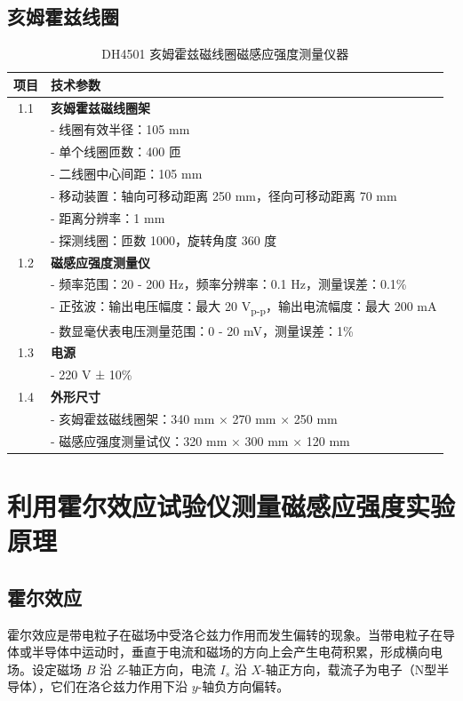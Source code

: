 \documentclass[a4paper,10pt]{article}
\begin{document}
\subsection{亥姆霍兹线圈}

\begin{table}[H]
\centering
\caption{DH4501 亥姆霍兹磁线圈磁感应强度测量仪器}
\begin{tabular}{|c|l|}
\hline
\textbf{项目} & \textbf{技术参数} \\ \hline
1.1 & \textbf{亥姆霍兹磁线圈架} \\ \hline
& \quad - 线圈有效半径：105 mm \\ \hline
& \quad - 单个线圈匝数：400 匝 \\ \hline
& \quad - 二线圈中心间距：105 mm \\ \hline
& \quad - 移动装置：轴向可移动距离 250 mm，径向可移动距离 70 mm \\ \hline
& \quad - 距离分辨率：1 mm \\ \hline
& \quad - 探测线圈：匝数 1000，旋转角度 360 度 \\ \hline
1.2 & \textbf{磁感应强度测量仪} \\ \hline
& \quad - 频率范围：20 - 200 Hz，频率分辨率：0.1 Hz，测量误差：0.1\% \\ \hline
& \quad - 正弦波：输出电压幅度：最大 20 V\textsubscript{p-p}，输出电流幅度：最大 200 mA \\ \hline
& \quad - 数显毫伏表电压测量范围：0 - 20 mV，测量误差：1\% \\ \hline
1.3 & \textbf{电源} \\ \hline
& \quad - 220 V ± 10\% \\ \hline
1.4 & \textbf{外形尺寸} \\ \hline
& \quad - 亥姆霍兹磁线圈架：340 mm × 270 mm × 250 mm \\ \hline
& \quad - 磁感应强度测量试仪：320 mm × 300 mm × 120 mm \\ \hline
\end{tabular}
\end{table}




\section{利用霍尔效应试验仪测量磁感应强度实验原理}

\subsection{霍尔效应}
霍尔效应是带电粒子在磁场中受洛仑兹力作用而发生偏转的现象。当带电粒子在导体或半导体中运动时，垂直于电流和磁场的方向上会产生电荷积累，形成横向电场。设定磁场 \( B \) 沿 \( Z \)-轴正方向，电流 \( I_s \) 沿 \( X \)-轴正方向，载流子为电子（N型半导体），它们在洛仑兹力作用下沿 \( y \)-轴负方向偏转。
\end{document}
